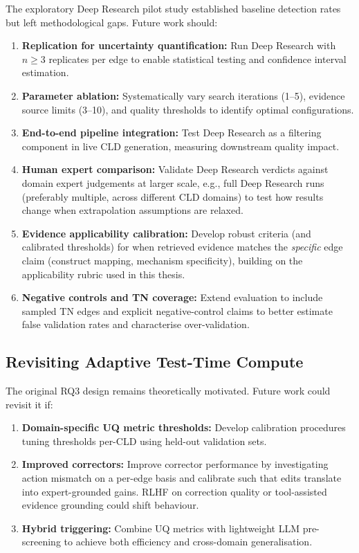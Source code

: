 The exploratory Deep Research pilot study established baseline detection rates but left methodological gaps. Future work should:
\begin{enumerate}[noitemsep]
    \item \textbf{Replication for uncertainty quantification:} Run Deep Research with $n \geq 3$ replicates per edge to enable statistical testing and confidence interval estimation.
    \item \textbf{Parameter ablation:} Systematically vary search iterations (1--5), evidence source limits (3--10), and quality thresholds to identify optimal configurations.
    \item \textbf{End-to-end pipeline integration:} Test Deep Research as a filtering component in live CLD generation, measuring downstream quality impact.
    \item \textbf{Human expert comparison:} Validate Deep Research verdicts against domain expert judgements at larger scale, e.g., full Deep Research runs (preferably multiple, across different CLD domains) to test how results change when extrapolation assumptions are relaxed.
    \item \textbf{Evidence applicability calibration:} Develop robust criteria (and calibrated thresholds) for when retrieved evidence matches the \textit{specific} edge claim (construct mapping, mechanism specificity), building on the applicability rubric used in this thesis.
    \item \textbf{Negative controls and TN coverage:} Extend evaluation to include sampled TN edges and explicit negative-control claims to better estimate false validation rates and characterise over-validation.
\end{enumerate}

\subsection{Revisiting Adaptive Test-Time Compute}

The original RQ3 design remains theoretically motivated. Future work could revisit it if:
\begin{enumerate}[noitemsep]
    \item \textbf{Domain-specific UQ metric thresholds:} Develop calibration procedures tuning thresholds per-CLD using held-out validation sets.
    \item \textbf{Improved correctors:} Improve corrector performance by investigating action mismatch on a per-edge basis and calibrate such that edits translate into expert-grounded gains. RLHF on correction quality or tool-assisted evidence grounding could shift behaviour.
    \item \textbf{Hybrid triggering:} Combine UQ metrics with lightweight LLM pre-screening to achieve both efficiency and cross-domain generalisation.
\end{enumerate}

